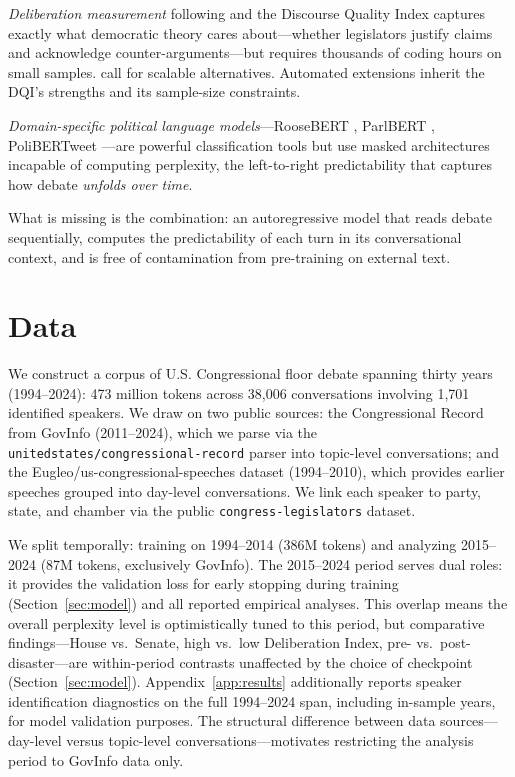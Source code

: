 \documentclass[12pt]{article}
\begin{document}
\textit{Deliberation measurement} following \citet{steiner2004} and the Discourse Quality Index captures exactly what democratic theory cares about---whether legislators justify claims and acknowledge counter-arguments---but requires thousands of coding hours on small samples. \citet{bachtiger2019} call for scalable alternatives. Automated extensions \citep{fournierTombs2021, flores2024} inherit the DQI's strengths and its sample-size constraints.

\textit{Domain-specific political language models}---RooseBERT \citep{evrard2025}, ParlBERT \citep{klamm2022}, PoliBERTweet \citep{kawintiranon2022}---are powerful classification tools but use masked architectures incapable of computing perplexity, the left-to-right predictability that captures how debate \textit{unfolds over time}.

What is missing is the combination: an autoregressive model that reads debate sequentially, computes the predictability of each turn in its conversational context, and is free of contamination from pre-training on external text.


\section{Data}

We construct a corpus of U.S. Congressional floor debate spanning thirty years (1994--2024): 473 million tokens across 38,006 conversations involving 1,701 identified speakers. We draw on two public sources: the Congressional Record from GovInfo \citep{govinfo} (2011--2024), which we parse via the \texttt{unitedstates/\allowbreak{}congressional-record} parser \citep{unitedstates_parser} into topic-level conversations; and the Eugleo/\allowbreak{}us-congressional-speeches dataset \citep{eugleo2023} (1994--2010), which provides earlier speeches grouped into day-level conversations. We link each speaker to party, state, and chamber via the public \texttt{congress-legislators} dataset.

We split temporally: training on 1994--2014 (386M tokens) and analyzing 2015--2024 (87M tokens, exclusively GovInfo). The 2015--2024 period serves dual roles: it provides the validation loss for early stopping during training (Section~\ref{sec:model}) and all reported empirical analyses. This overlap means the overall perplexity level is optimistically tuned to this period, but comparative findings---House vs.\ Senate, high vs.\ low Deliberation Index, pre- vs.\ post-disaster---are within-period contrasts unaffected by the choice of checkpoint (Section~\ref{sec:model}). Appendix~\ref{app:results} additionally reports speaker identification diagnostics on the full 1994--2024 span, including in-sample years, for model validation purposes. The structural difference between data sources---day-level versus topic-level conversations---motivates restricting the analysis period to GovInfo data only.
\end{document}
